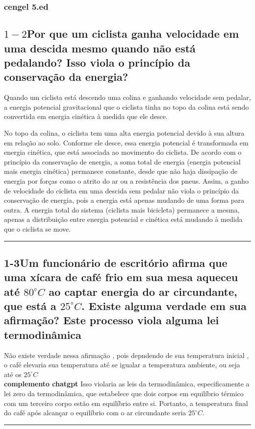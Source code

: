 \documentclass{article}
\begin{document}
\subsubsection{cengel 5.ed}
\subsection*{$1-2$Por que um ciclista ganha velocidade em uma descida mesmo quando não está pedalando? Isso viola o princípio da conservação da energia?}
Quando um ciclista está descendo uma colina e ganhando velocidade sem pedalar, a energia potencial gravitacional que o ciclista tinha no topo da colina está sendo convertida em energia cinética à medida que ele desce.

No topo da colina, o ciclista tem uma alta energia potencial devido à sua altura em relação ao solo. Conforme ele desce, essa energia potencial é transformada em energia cinética, que está associada ao movimento do ciclista. De acordo com o princípio da conservação de energia, a soma total de energia (energia potencial mais energia cinética) permanece constante, desde que não haja dissipação de energia por forças como o atrito do ar ou a resistência dos pneus.
Assim, a ganho de velocidade do ciclista em uma descida sem pedalar não viola o princípio da conservação de energia, pois a energia está apenas mudando de uma forma para outra. A energia total do sistema (ciclista mais bicicleta) permanece a mesma, apenas a distribuição entre energia potencial e cinética está mudando à medida que o ciclista se move.\\

\noindent\rule{\textwidth}{0.4pt}
\subsection*{1-3Um funcionário de escritório afirma que uma xícara de café frio em sua mesa aqueceu até $80^\circ C$ ao captar energia do ar circundante, que está a $25^\circ C$. Existe alguma verdade em sua afirmação? Este processo viola alguma lei termodinâmica}
Não existe verdade nessa afirmação , pois depndendo de sua temperatura inicial , o café elevaria sua temperatura até se igualar a temperatura ambiente, ou seja até os $25^\circ C$  \\
\textbf{complemento chatgpt}
Isso violaria as leis da termodinâmica, especificamente a lei zero da termodinâmica, que estabelece que dois corpos em equilíbrio térmico com um terceiro corpo estão em equilíbrio  entre si. Portanto, a temperatura final do café após alcançar o equilíbrio  com o ar circundante seria $25^\circ C$.
\noindent\rule{\textwidth}{0.4pt}\\
\end{document}
